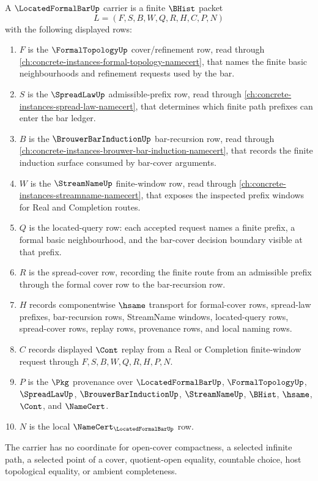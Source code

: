 \begin{definition}
\label{def:located-formal-bar-carrier}
A $\LocatedFormalBarUp$ carrier is a finite $\BHist$ packet
$$
L=(F,S,B,W,Q,R,H,C,P,N)
$$
with the following displayed rows:
\begin{enumerate}
\item $F$ is the $\FormalTopologyUp$ cover/refinement row, read through \autoref{ch:concrete-instances-formal-topology-namecert}, that names the finite basic neighbourhoods and refinement requests used by the bar.
\item $S$ is the $\SpreadLawUp$ admissible-prefix row, read through \autoref{ch:concrete-instances-spread-law-namecert}, that determines which finite path prefixes can enter the bar ledger.
\item $B$ is the $\BrouwerBarInductionUp$ bar-recursion row, read through \autoref{ch:concrete-instances-brouwer-bar-induction-namecert}, that records the finite induction surface consumed by bar-cover arguments.
\item $W$ is the $\StreamNameUp$ finite-window row, read through \autoref{ch:concrete-instances-streamname-namecert}, that exposes the inspected prefix windows for Real and Completion routes.
\item $Q$ is the located-query row: each accepted request names a finite prefix, a formal basic neighbourhood, and the bar-cover decision boundary visible at that prefix.
\item $R$ is the spread-cover row, recording the finite route from an admissible prefix through the formal cover row to the bar-recursion row.
\item $H$ records componentwise $\hsame$ transport for formal-cover rows, spread-law prefixes, bar-recursion rows, StreamName windows, located-query rows, spread-cover rows, replay rows, provenance rows, and local naming rows.
\item $C$ records displayed $\Cont$ replay from a Real or Completion finite-window request through $F,S,B,W,Q,R,H,P,N$.
\item $P$ is the $\Pkg$ provenance over $\LocatedFormalBarUp$, $\FormalTopologyUp$, $\SpreadLawUp$, $\BrouwerBarInductionUp$, $\StreamNameUp$, $\BHist$, $\hsame$, $\Cont$, and $\NameCert$.
\item $N$ is the local $\NameCert_{\LocatedFormalBarUp}$ row.
\end{enumerate}
The carrier has no coordinate for open-cover compactness, a selected infinite path, a selected point of a cover, quotient-open equality, countable choice, host topological equality, or ambient completeness.
\end{definition}

